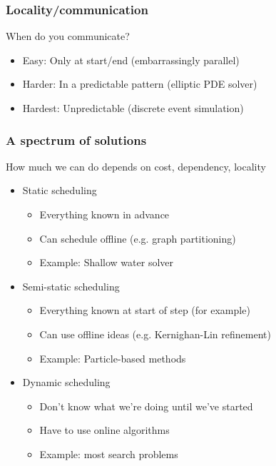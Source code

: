 \documentclass{beamer}
\begin{document}
\begin{frame}
  \frametitle{Locality/communication}

  When do you communicate?
  \begin{itemize}
  \item Easy: Only at start/end 
    (embarrassingly parallel)
  \item Harder: In a predictable pattern
    (elliptic PDE solver)
  \item Hardest: Unpredictable
    (discrete event simulation)
  \end{itemize}
\end{frame}


\begin{frame}
  \frametitle{A spectrum of solutions}

  How much we can do depends on cost, dependency, locality
  \begin{itemize}
  \item Static scheduling
    \begin{itemize}
    \item Everything known in advance
    \item Can schedule offline (e.g. graph partitioning)
    \item Example: Shallow water solver
    \end{itemize}
  \item Semi-static scheduling
    \begin{itemize}
    \item Everything known at start of step (for example)
    \item Can use offline ideas (e.g. Kernighan-Lin refinement)
    \item Example: Particle-based methods
    \end{itemize}
  \item Dynamic scheduling
    \begin{itemize}
    \item Don't know what we're doing until we've started
    \item Have to use online algorithms
    \item Example: most search problems
    \end{itemize}
  \end{itemize}
\end{frame}
\end{document}
